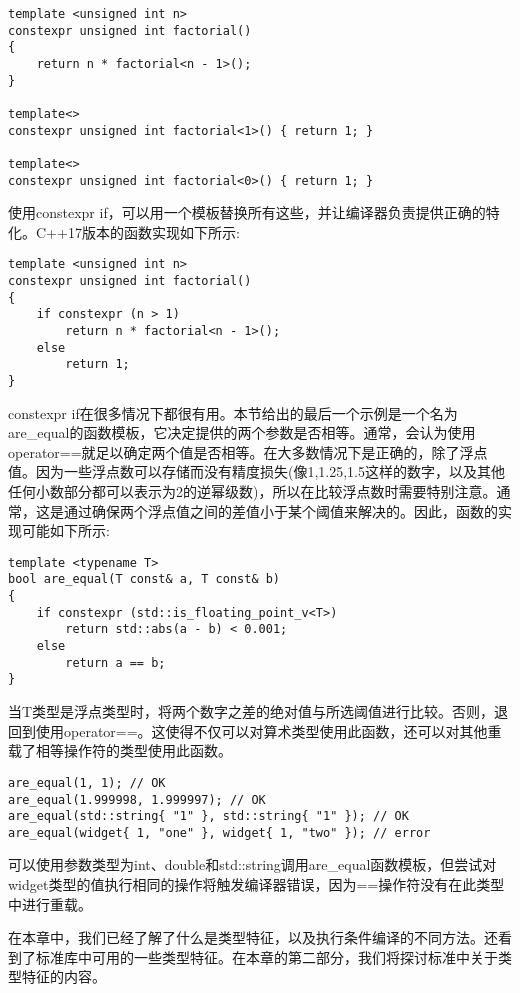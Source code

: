 \begin{lstlisting}[style=styleCXX]
template <unsigned int n>
constexpr unsigned int factorial()
{
	return n * factorial<n - 1>();
}

template<>
constexpr unsigned int factorial<1>() { return 1; }

template<>
constexpr unsigned int factorial<0>() { return 1; }
\end{lstlisting}

使用constexpr if，可以用一个模板替换所有这些，并让编译器负责提供正确的特化。C++17版本的函数实现如下所示:

\begin{lstlisting}[style=styleCXX]
template <unsigned int n>
constexpr unsigned int factorial()
{
	if constexpr (n > 1)
		return n * factorial<n - 1>();
	else
		return 1;
}
\end{lstlisting}

constexpr if在很多情况下都很有用。本节给出的最后一个示例是一个名为are\_equal的函数模板，它决定提供的两个参数是否相等。通常，会认为使用operator==就足以确定两个值是否相等。在大多数情况下是正确的，除了浮点值。因为一些浮点数可以存储而没有精度损失(像1,1.25,1.5这样的数字，以及其他任何小数部分都可以表示为2的逆幂级数)，所以在比较浮点数时需要特别注意。通常，这是通过确保两个浮点值之间的差值小于某个阈值来解决的。因此，函数的实现可能如下所示:


\begin{lstlisting}[style=styleCXX]
template <typename T>
bool are_equal(T const& a, T const& b)
{
	if constexpr (std::is_floating_point_v<T>)
		return std::abs(a - b) < 0.001;
	else
		return a == b;
}
\end{lstlisting}

当T类型是浮点类型时，将两个数字之差的绝对值与所选阈值进行比较。否则，退回到使用operator==。这使得不仅可以对算术类型使用此函数，还可以对其他重载了相等操作符的类型使用此函数。

\begin{lstlisting}[style=styleCXX]
are_equal(1, 1); // OK
are_equal(1.999998, 1.999997); // OK
are_equal(std::string{ "1" }, std::string{ "1" }); // OK
are_equal(widget{ 1, "one" }, widget{ 1, "two" }); // error
\end{lstlisting}

可以使用参数类型为int、double和std::string调用are\_equal函数模板，但尝试对widget类型的值执行相同的操作将触发编译器错误，因为==操作符没有在此类型中进行重载。

在本章中，我们已经了解了什么是类型特征，以及执行条件编译的不同方法。还看到了标准库中可用的一些类型特征。在本章的第二部分，我们将探讨标准中关于类型特征的内容。






































